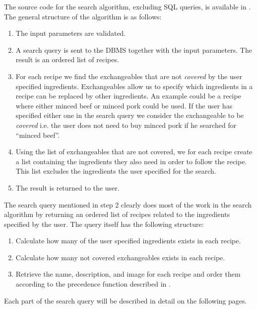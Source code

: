 The source code for the search algorithm, excluding SQL queries, is available in . The general structure of the algorithm is as follows:
\begin{enumerate}
\item The input parameters are validated.
\item A search query is sent to the DBMS together with the input parameters. The result is an ordered list of recipes.
\item For each recipe we find the exchangeables that are not \textit{covered} by the user specified ingredients. Exchangeables allow us to specify which ingredients in a recipe can be replaced by other ingredients. An example could be a recipe where either minced beef or minced pork could be used. If the user has specified either one in the search query we consider the exchangeable to be \textit{covered} i.e. the user does not need to buy minced pork if he searched for ``minced beef''.
\item Using the list of exchangeables that are not covered, we for each recipe create a list containing the ingredients they also need in order to follow the recipe. This list excludes the ingredients the user specified for the search.
\item The result is returned to the user.
\end{enumerate}

The search query mentioned in step 2 clearly does most of the work in the search algorithm by returning an ordered list of recipes related to the ingredients specified by the user. The query itself has the following structure:
\begin{enumerate}
\item Calculate how many of the user specified ingredients exists in each recipe.
\item Calculate how many not covered exchangeables exists in each recipe.
\item Retrieve the name, description, and image for each recipe and order them according to the precedence function described in .
\end{enumerate}

Each part of the search query will be described in detail on the following pages.

